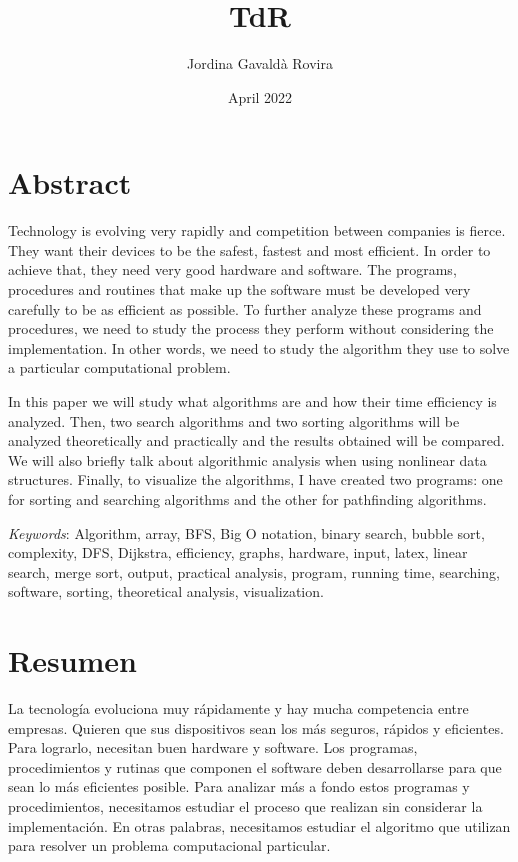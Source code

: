 \documentclass[12pt, a4paper, oneside]{report}
\title{TdR}
\author{Jordina Gavaldà Rovira}
\date{April 2022}
\begin{document}



\pagestyle{empty}
\tableofcontents
{}

\newpage

\pagestyle{fancy}

\listoffigures

\chapter*{Abstract}
Technology is evolving very rapidly and competition between companies is fierce. They want their devices to be the safest, fastest and most efficient. In order to achieve that, they need very good hardware and software. The programs, procedures and routines that make up the software must be developed very carefully to be as efficient as possible. To further analyze these programs and procedures, we need to study the process they perform without considering the implementation. In other words, we need to study the algorithm they use to solve a particular computational problem.

In this paper we will study what algorithms are and how their time efficiency is analyzed. Then, two search algorithms and two sorting algorithms will be analyzed theoretically and practically and the results obtained will be compared. We will also briefly talk about algorithmic analysis when using nonlinear data structures. Finally, to visualize the algorithms, I have created two programs: one for sorting and searching algorithms and the other for pathfinding algorithms.

\textit{Keywords}: Algorithm, array, BFS, Big O notation, binary search, bubble sort, complexity, DFS, Dijkstra, efficiency, graphs, hardware, input, latex, linear search, merge sort, output, practical analysis, program, running time, searching, software, sorting, theoretical analysis, visualization.
\newpage

\chapter*{Resumen}
La tecnología evoluciona muy rápidamente y hay mucha competencia entre empresas. Quieren que sus dispositivos sean los más seguros, rápidos y eficientes. Para lograrlo, necesitan buen  hardware y software. Los programas, procedimientos y rutinas que componen el software deben desarrollarse para que sean lo más eficientes posible. Para analizar más a fondo estos programas y procedimientos, necesitamos estudiar el proceso que realizan sin considerar la implementación. En otras palabras, necesitamos estudiar el algoritmo que utilizan para resolver un problema computacional particular.
\end{document}
